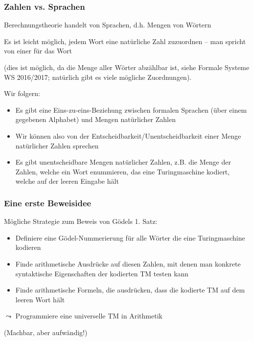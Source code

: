 \documentclass[onlymath]{beamer}
\begin{document}
\begin{frame}\frametitle{Zahlen vs. Sprachen}

Berechnungstheorie handelt von Sprachen, d.h. Mengen von Wörtern
\bigskip

Es ist leicht möglich, jedem Wort eine natürliche Zahl zuzuordnen -- man spricht von einer  für das Wort\\[0.5ex]
{\tiny(dies ist möglich, da die Menge aller Wörter abzählbar ist, siehe Formale Systeme WS 2016/2017; natürlich gibt es viele mögliche Zuordnungen).

}
\bigskip\pause

Wir folgern:
\begin{itemize}
\item Es gibt eine Eins-zu-eins-Beziehung zwischen formalen Sprachen (über einem gegebenen Alphabet) und Mengen natürlicher Zahlen
\item Wir können also von der Entscheidbarkeit/Unentscheidbarkeit einer Menge natürlicher Zahlen sprechen
\item Es gibt unentscheidbare Mengen natürlicher Zahlen, z.B. die Menge der Zahlen, welche ein Wort enummieren, das eine Turingmaschine kodiert, welche auf der leeren Eingabe hält
\end{itemize}

\end{frame}

\begin{frame}\frametitle{Eine erste Beweisidee}

Mögliche Strategie zum Beweis von Gödels 1. Satz:
\begin{itemize}
\item Definiere eine Gödel-Nummerierung für alle Wörter die eine Turingmaschine kodieren
\item Finde arithmetische Ausdrücke auf diesen Zahlen, mit denen man konkrete syntaktische Eigenschaften der kodierten TM testen kann
\item Finde arithmetische Formeln, die ausdrücken, dass die kodierte TM auf dem leeren Wort hält
\end{itemize}\pause
\alert{$\leadsto$ Programmiere eine universelle TM in Arithmetik}\bigskip

(Machbar, aber aufwändig!)

\end{frame}
\end{document}
